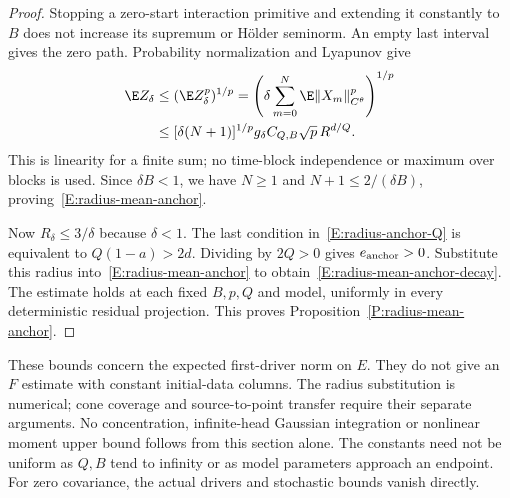 \begin{proof}
  Stopping a zero-start interaction primitive and extending it
  constantly to $B$ does not increase its supremum or H\"older
  seminorm. An empty last interval gives the zero path.
  Probability normalization and Lyapunov give
  \begin{align*}
    \E Z_\delta
    &\le(\E Z_\delta^p)^{1/p}
    =\left(\delta\sum_{m=0}^N
    \E\|X_m\|_{C^\theta}^p\right)^{1/p}\\
    &\le[\delta(N+1)]^{1/p}g_\delta
    C_{Q,B}\sqrt p\,R^{d/Q}.
  \end{align*}
  This is linearity for a finite sum; no time-block independence
  or maximum over blocks is used.
  Since $\delta B<1$, we have $N\ge1$ and
  $N+1\le2/(\delta B)$, proving~\eqref{E:radius-mean-anchor}.

  Now $R_\delta\le3/\delta$ because $\delta<1$.
  The last condition in~\eqref{E:radius-anchor-Q} is equivalent to
  $Q(1-a)>2d$. Dividing by $2Q>0$ gives
  $e_{\rm anchor}>0$.
  Substitute this radius into~\eqref{E:radius-mean-anchor}
  to obtain~\eqref{E:radius-mean-anchor-decay}.
  The estimate holds at each fixed $B,p,Q$ and model, uniformly
  in every deterministic residual projection.
  This proves Proposition~\ref{P:radius-mean-anchor}.
\end{proof}

These bounds concern the expected first-driver norm on $E$.
They do not give an $F$ estimate with constant initial-data columns.
The radius substitution is numerical; cone coverage and source-to-point
transfer require their separate arguments.
No concentration, infinite-head Gaussian integration or nonlinear moment
upper bound follows from this section alone.
The constants need not be uniform as $Q,B$ tend to infinity or as model
parameters approach an endpoint. For zero covariance, the actual drivers
and stochastic bounds vanish directly.

